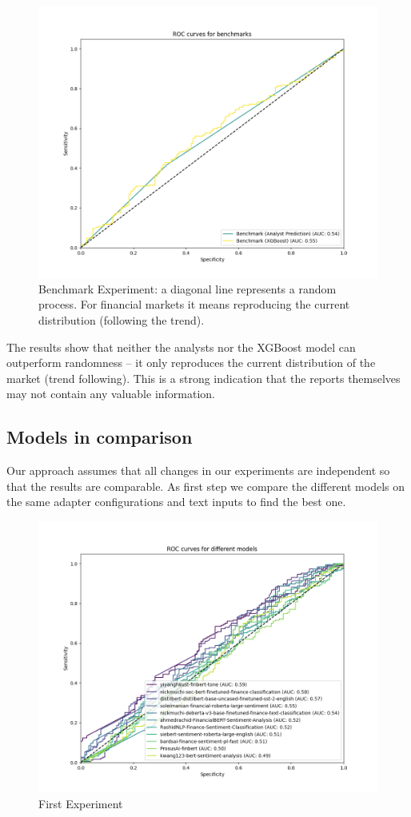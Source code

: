 \documentclass[conference]{IEEEtran}
\begin{document}
\begin{figure}[H]
    \centering
    \includegraphics[width=.85\linewidth]{../3. evaluation/roc_curves/Zero Experiment.png}
    \caption[First Experiment]{Benchmark Experiment: a diagonal line represents a random process. For financial markets it means reproducing the current distribution (following the trend).}
    \label{fig:Zeroexp}
\end{figure}

The results show that neither the analysts nor the XGBoost model can outperform randomness -- it only reproduces the current distribution of the market (trend following). This is a strong indication that the reports themselves may not contain any valuable information.


\subsection{Models in comparison}%
Our approach assumes that all changes in our experiments are independent so that the results are comparable. As first step we compare the different models on the same adapter configurations and text inputs to find the best one.

\begin{figure}[H]
    \centering
    \includegraphics[width=.85\linewidth]{../3. evaluation/roc_curves/First Experiment.png}
    \caption[First Experiment]{First Experiment}
    \label{fig:Firstexp}
\end{figure}
\end{document}
